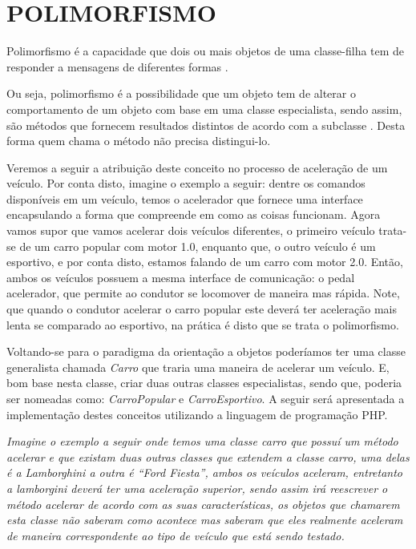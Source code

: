 \section{POLIMORFISMO}

Polimorfismo é a capacidade que dois ou mais objetos de uma classe-filha tem  de
responder a mensagens de diferentes formas
\cite{php5ConceitosProgramacaoEIntegracaoComBancoDeDados}.

Ou seja, polimorfismo é a possibilidade que um objeto tem de alterar o
comportamento de um objeto com base em uma classe especialista, sendo assim, 
são métodos que fornecem resultados distintos  de acordo com a subclasse 
\cite{php5ConceitosProgramacaoEIntegracaoComBancoDeDados}. Desta forma quem 
chama o método não precisa distingui-lo.

Veremos a seguir a atribuição deste conceito no processo de aceleração de um
veículo. Por conta disto, imagine o exemplo a seguir: dentre os comandos 
disponíveis em um veículo, temos o acelerador que fornece uma interface 
encapsulando a forma que compreende em como as coisas funcionam. Agora vamos 
supor que vamos acelerar dois veículos diferentes, o primeiro veículo trata-se 
de um carro popular com motor 1.0, enquanto que, o outro veículo é um 
 esportivo, e por conta disto, estamos falando de um carro com motor 2.0. Então,
ambos os veículos possuem a mesma interface de comunicação: o pedal acelerador, 
que permite ao condutor se locomover de maneira mas rápida. Note, que quando o 
condutor acelerar o carro popular este deverá ter aceleração mais lenta se 
comparado ao esportivo, na prática é disto que se trata o polimorfismo.

Voltando-se para o paradigma da orientação a objetos poderíamos ter uma classe
generalista chamada \textit{Carro} que traria uma maneira de acelerar um
veículo.  E, bom base nesta classe, criar duas outras classes especialistas, sendo que, 
poderia ser nomeadas como: \textit{CarroPopular} e \textit{CarroEsportivo}.
A seguir será apresentada a implementação destes conceitos
utilizando a linguagem de programação PHP.

\textit{Imagine o exemplo a seguir onde temos uma classe carro que possuí um
método acelerar e que existam duas outras classes que extendem a classe carro, uma 
delas é a Lamborghini a outra é “Ford Fiesta”, ambos os veículos
aceleram, entretanto a lamborgini deverá ter uma aceleração superior, sendo assim irá 
reescrever o método acelerar de acordo com as suas características, os objetos 
que chamarem esta classe não saberam como acontece mas saberam que eles
realmente  aceleram de maneira correspondente ao tipo de veículo que está sendo 
testado.}